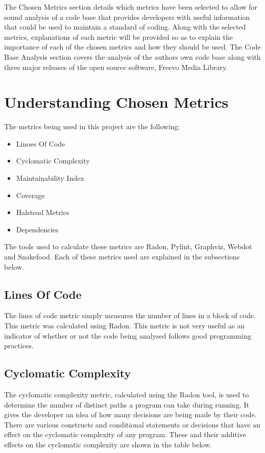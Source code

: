 \documentclass[10.5pt,journal, a4paper]{IEEEtran}
\begin{document}
\noindent
The Chosen Metrics section details which metrics have been selected to allow for sound analysis of a code base that provides developers with useful information that could be used to maintain a standard of coding. Along with the selected metrics, explanations of each metric will be provided so as to explain the importance of each of the chosen metrics and how they should be used. The Code Base Analysis section covers the analysis of the authors own code base along with three major releases of the open source software, Freevo Media Library. 



\section{Understanding Chosen Metrics}
\noindent
The metrics being used in this project are the following:
\begin{itemize}
\item Linoes Of Code
\item Cyclomatic Complexity
\item Maintainability Index
\item Coverage
\item Halstead Metrics
\item Dependencies
\end{itemize}
\noindent
The tools used to calculate these metrics are Radon, Pylint, Graphviz, Webdot and Snakefood. Each of these metrics used are explained in the subsections below.

\subsection{Lines Of Code}
\noindent
The lines of code metric simply measures the number of lines in a block of code. This metric was calculated using Radon. This metric is not very useful as an indicator of whether or not the code being analysed follows good programming practices. 

\subsection{Cyclomatic Complexity}
\noindent
The cyclomatic complexity metric, calculated using the Radon tool, is used to determine the number of distinct paths a program can take during running. It gives the developer an idea of how many decisions are being made by their code. There are various constructs and conditional statements or decisions that have an effect on the cyclomatic complexity of any program. These and their additive  effects on the cyclomatic complexity are shown in the table below. 
\end{document}
